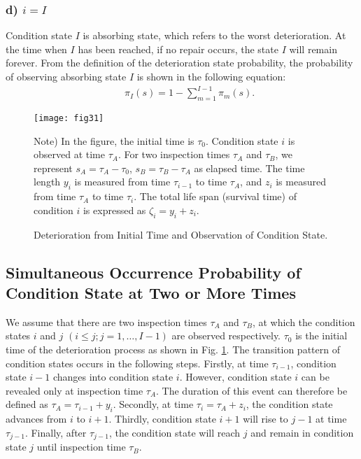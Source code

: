 \subsubsection{d) $i=I$ }
\label{3324}
Condition state $I$ is absorbing state, which refers to the worst deterioration. At the time when $I$ has been reached, if no repair occurs, the state $I$ will remain forever. From the definition of the deterioration state probability, the probability of observing absorbing state $I$ is shown in the following equation:
\begin{eqnarray}
&& \pi_I(s)=1-\sum_{m=1}^{I-1}\pi_m(s).\label{oo}
\end{eqnarray}

\begin{figure}[t]
\begin{center}
\texttt{[image: fig31]} 
\end{center}
\footnotesize Note) In the figure, the initial time is $\tau_0$. Condition state $i$ is observed at time $\tau_A$. For two inspection times $\tau_A$ and $\tau_B$, we represent $s_A=\tau_A-\tau_0$, $s_B=\tau_B-\tau_A$ as elapsed time. The time length $y_i$ is measured from time $\tau_{i-1}$ to time $\tau_A$, and $z_i$ is measured from time $\tau_A$ to time $\tau_i$. The total life span (survival time) of condition $i$ is expressed as $\zeta_i=y_i+z_i$.
\caption{Deterioration from Initial Time and Observation of Condition State.}
\label{fig31} 
\end{figure}%
\subsection{Simultaneous Occurrence Probability of Condition State at Two or More Times}
\label{333}
We assume that there are two inspection times $\tau_A$ and $\tau_B$, at which the condition states $i$ and $j$ $(i\leq j;j=1,\dots,I-1)$ are observed respectively. $\tau_{0}$ is the initial time of the deterioration process as shown in Fig. \ref{fig31}. The transition pattern of condition states occurs in the following steps. Firstly, at time $\tau_{i-1}$, condition state $i-1$ changes into condition state $i$. However, condition state $i$ can be revealed only at inspection time $\tau_A$. The duration of this event can therefore be defined as $\tau_A=\tau_{i-1}+y_i$. Secondly, at time $\tau_i=\tau_A+z_i$, the condition state advances from $i$ to $i+1$. Thirdly, condition state $i+1$ will rise to $j-1$ at time $\tau_{j-1}$. Finally, after $\tau_{j-1}$, the condition state will reach $j$ and remain in condition state $j$ until inspection time $\tau_B$. 

